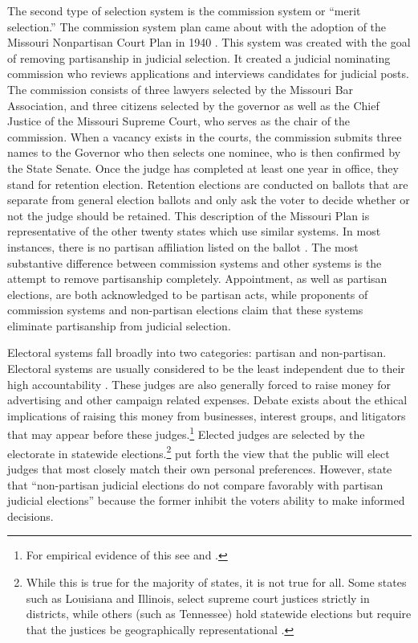 \documentclass[12pt]{article}
\begin{document}
The second type of selection system is the commission system or “merit selection.” The commission system plan came about with the adoption of the Missouri Nonpartisan Court Plan in 1940 \citep{Watson1969}. This system was created with the goal of removing partisanship in judicial selection. It created a judicial nominating commission who reviews applications and interviews candidates for judicial posts. The commission consists of three lawyers selected by the Missouri Bar Association, and three citizens selected by the governor as well as the Chief Justice of the Missouri Supreme Court, who serves as the chair of the commission. When a vacancy exists in the courts, the commission submits three names to the Governor who then selects one nominee, who is then confirmed by the State Senate. Once the judge has completed at least one year in office, they stand for retention election. Retention elections are conducted on ballots that are separate from general election ballots and only ask the voter to decide whether or not the judge should be retained. This description of the Missouri Plan is representative of the other twenty states which use similar systems.  In most instances, there is no partisan affiliation listed on the ballot \citep{Watson1969}.  The most substantive difference between commission systems and other systems is the attempt to remove partisanship completely. Appointment, as well as partisan elections, are both acknowledged to be partisan acts, while proponents of commission systems and non-partisan elections claim that these systems eliminate partisanship from judicial selection. 

Electoral systems fall broadly into two categories: partisan and non-partisan.  Electoral systems are usually considered to be the least independent due to their high accountability \citep{Choi2010}. These judges are also generally forced to raise money for advertising and other campaign related expenses.  Debate exists about the ethical implications of raising this money from businesses, interest groups, and litigators that may appear before these judges.\footnote{For empirical evidence of this see \citet{Gibson2008} and \citet{hall2014attacking}.}  Elected judges are selected by the electorate in statewide elections.\footnote{While this is true for the majority of states, it is not true for all.  Some states such as Louisiana and Illinois, select supreme court justices strictly in districts, while others (such as Tennessee) hold statewide elections but require that the justices be geographically representational \citep{Bonneau2010}.}  \citet{Caldarone2009} put forth the view that the public will elect judges that most closely match their own personal preferences.  However, \citet{Debow2013} state that ``non-partisan judicial elections do not compare favorably with partisan judicial elections'' because the former inhibit the voters ability to make informed decisions.
\end{document}
